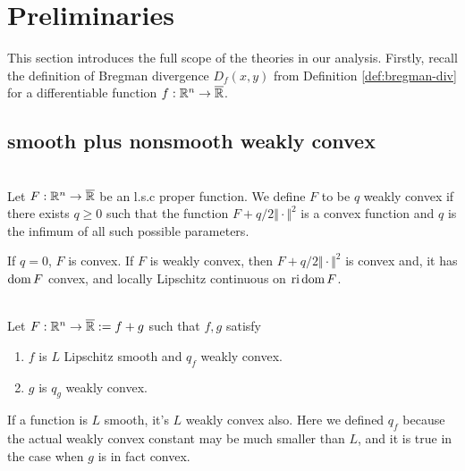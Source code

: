 \documentclass[12pt]{report}
\begin{document}
    
    \section{Preliminaries}
        This section introduces the full scope of the theories in our analysis. 
        Firstly, recall the definition of Bregman divergence $D_f(x, y)$ from Definition \ref{def:bregman-div} for a differentiable function $f:\mathbb R^n \rightarrow \overline {\mathbb R}$. 
        \subsection{smooth plus nonsmooth weakly convex}
            \begin{definition}\;\label{def:wcnvx-fxn}\\
                Let $F: \mathbb R^n \rightarrow\overline {\mathbb R}$ be an l.s.c proper function. 
                We define $F$ to be $q$ weakly convex if there exists $q \ge 0$ such that the function $F + q/2\Vert \cdot\Vert^2$ is a convex function and $q$ is the infimum of all such possible parameters. 
            \end{definition}
            \begin{remark}
                If $q = 0$, $F$ is convex.
                If $F$ is weakly convex, then $F + q/2\Vert \cdot\Vert^2$ is convex and, it has $\operatorname{dom} F$ convex, and locally Lipschitz continuous on $\operatorname{ri} \operatorname{dom} F$. 
            \end{remark}
            \begin{assumption}\;\label{ass:sum-of-wcnvx}\\
                Let $F: \mathbb R^n \rightarrow \overline{\mathbb R}:= f + g$ such that $f, g$ satisfy 
                \begin{enumerate}
                    \item $f$ is $L$ Lipschitz smooth and $q_f$ weakly convex. 
                    \item $g$ is $q_g$ weakly convex. 
                \end{enumerate}
            \end{assumption}
            \begin{remark}
                If a function is $L$ smooth, it's $L$ weakly convex also. 
                Here we defined $q_f$ because the actual weakly convex constant may be much smaller than $L$, and it is true in the case when $g$ is in fact convex.  
            \end{remark}
\end{document}
